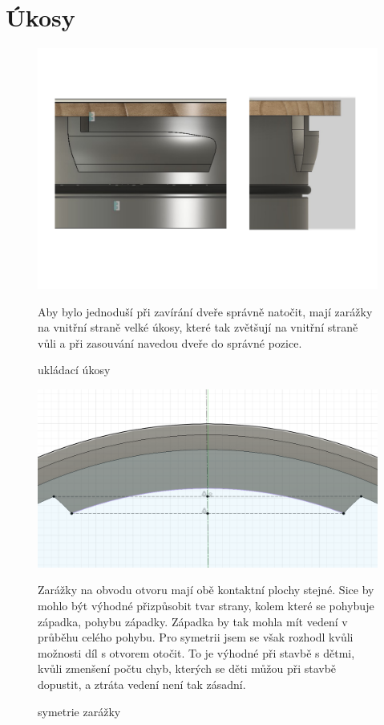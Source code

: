 \section{Úkosy}

\begin{figure}[htbp]  
    \centering
    \includegraphics[width=400pt]{kapitoly/obrazky/E4/ukozy/ukladaci_ukosy.pdf}
    \caption{ukládací úkosy}
    Aby bylo jednoduší při zavírání dveře správně natočit, mají zarážky na vnitřní straně velké úkosy, které tak zvětšují na vnitřní straně 
    vůli a při zasouvání navedou dveře do správné pozice.
    \label{fig:E4-ukosy}
\end{figure}

\begin{figure}[htbp]
    \centering
    \includegraphics[width=400pt]{kapitoly/obrazky/E4/ukozy/simetrie_zarazek.png}
    \caption{symetrie zarážky}
    Zarážky na obvodu otvoru mají obě kontaktní plochy stejné. Sice by mohlo být výhodné přizpůsobit tvar strany, kolem které se pohybuje západka, 
    pohybu západky. Západka by tak mohla mít vedení v průběhu celého pohybu. Pro symetrii jsem se však rozhodl kvůli možnosti díl s otvorem otočit.
    To je výhodné při stavbě s dětmi, kvůli zmenšení počtu chyb, kterých se děti můžou při stavbě dopustit, a ztráta vedení není tak zásadní.
    \label{fig:E4-simetrie_zarazky}
\end{figure}

\clearpage
\newpage